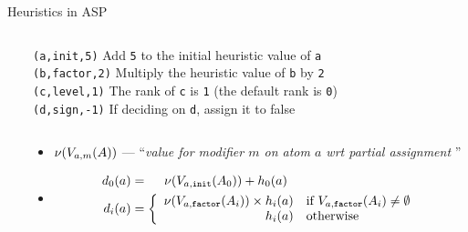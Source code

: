 \begin{block}{Heuristics in ASP}
\begin{columns}
\begin{column}{.98\linewidth}
\begin{itemize}


\ \ \ \ \texttt{\hpredicate(a,init,5)} Add \verb|5| to the initial heuristic value of \verb|a|  
\\ \ \ \ \ \texttt{\hpredicate(b,factor,2)} Multiply the heuristic value of \verb|b| by \verb|2|
\\ \ \ \ \ \texttt{\hpredicate(c,level,1)}  The rank of \verb|c| is \verb|1| (the default rank is \verb|0|)
\\ \ \ \ \ \texttt{\hpredicate(d,sign,-1)}  If deciding on \verb|d|, assign it to false

 


\end{itemize}

\end{column} \end{columns}

\bigskip \bigskip %


\begin{columns} \begin{column}{.02\linewidth}\end{column}
\begin{column}{.98\linewidth}

  \begin{itemize}
  \item $\nu(V_{a,m}(A))$ --- ``{\em value for modifier $m$ on atom $a$ wrt partial assignment \ass}''

\bigskip

  \item {}
    \begin{align*}
      d_0(a)&=\quad\;\nu(V_{a,\mathtt{init}}(A_0))+h_0(a)
      \\
      d_i(a) & =
        \left\{
          \begin{array}{rl}
            \nu(V_{a,\mathtt{factor}}(A_i))\times h_i(a)&\text{if } V_{a,\mathtt{factor}}(A_i)\neq\emptyset
            \\
            h_i(a)&\text{otherwise}
          \end{array}
        \right.
    \end{align*}



\end{itemize}
\end{column}
\end{columns}
\end{block}
